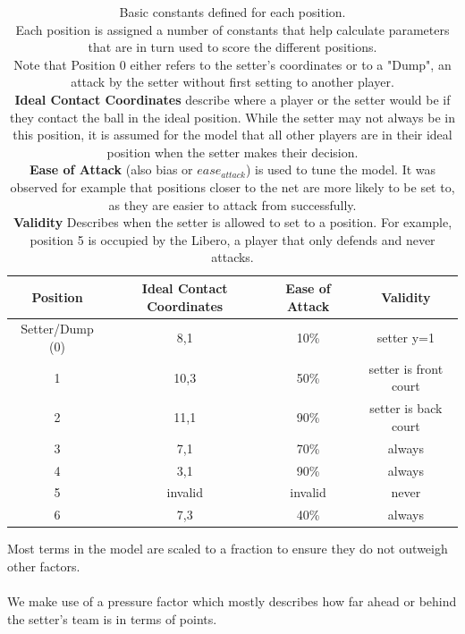 \documentclass[main.tex]{subfiles}
\begin{document}
      \begin{table}[h!]
        \label{tab:positions}
        \centering
        \caption{Basic constants defined for each position. \\
          Each position is assigned a number of constants that help calculate parameters that are in turn used to score the different positions. \\
          Note that Position 0 either refers to the setter's coordinates or to a "Dump", an attack by the setter without first setting to another player. \\
          \textbf{Ideal Contact Coordinates} describe where a player or the setter would be if they contact the ball in the ideal position. While the setter may not always be in this position, it is assumed for the model that all other players are in their ideal position when the setter makes their decision. \\
          \textbf{Ease of Attack} (also bias or \(ease_{attack}\)) is used to tune the model. It was observed for example that positions closer to the net are more likely to be set to, as they are easier to attack from successfully. \\
          \textbf{Validity} Describes when the setter is allowed to set to a position. For example, position 5 is occupied by the Libero, a player that only defends and never attacks. 
          }
        \small
        \begin{tabular}{ c | c c c }
          \hline
          Position  & Ideal Contact Coordinates & Ease of Attack & Validity \\ \hline \hline
          Setter/Dump (0) &  8,1 & 10\% & setter y=1 \\
          1 & 10,3 & 50\% & setter is front court \\
          2 & 11,1 & 90\% & setter is back court \\
          3 & 7,1 & 70\% &  always \\
          4 & 3,1 & 90\% & always \\
          5 & invalid & invalid & never\\
          6 & 7,3 & 40\% & always \\
          \hline
        \end{tabular}
        \normalsize
      \end{table}
      Most terms in the model are scaled to a fraction to ensure they do not outweigh other factors.
      \\\\
      We make use of a pressure factor which mostly describes how far ahead or behind the setter's team is in terms of points.
      
\end{document}
